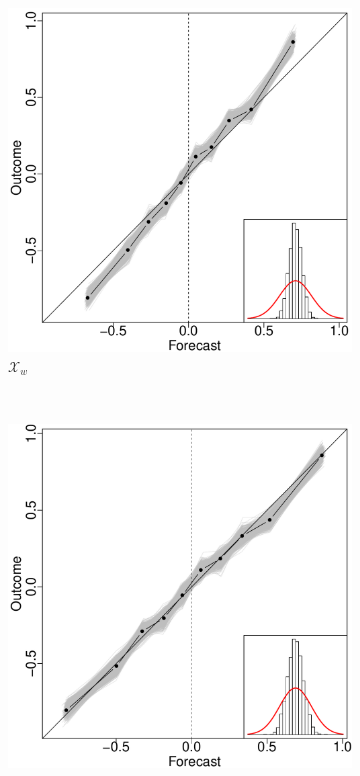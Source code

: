 \documentclass[12pt]{article}
\theoremstyle{definition}
\theoremstyle{definition}
\begin{document}
\begin{figure}[t!]
\begin{subfigure}[b]{0.240\textwidth}
                \includegraphics[width=\textwidth]{SimDepOLP.pdf}
                \caption{$\mathcal{X}_w$}
        \label{RelOWAHigh}
        \end{subfigure}
        ~ %
        \begin{subfigure}[b]{0.240\textwidth}
                \includegraphics[width=\textwidth]{SimDepELOP.pdf}

\end{subfigure}
\end{figure}
\end{document}
